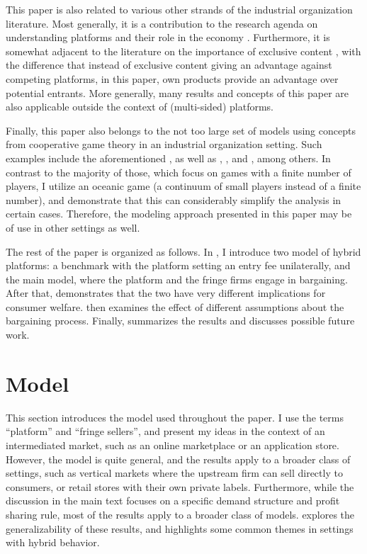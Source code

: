 \documentclass[a4paper]{article}
\begin{document}
This paper is also related to various other strands of the industrial organization literature.
Most generally, it is a contribution to the research agenda on understanding platforms and their role in the economy \parencite[e.g.][]{rochet2003platform,hagiu2004optimal,armstrong2006competition,evans2011platform,lee2014competing}.
Furthermore, it is somewhat adjacent to the literature on the importance of exclusive content \parencite[e.g.][]{hagiu2011exclusivity,lee2013vertical,dou2014sell,weeds2016tv}, with the difference that instead of exclusive content giving an advantage against competing platforms, in this paper, own products provide an advantage over potential entrants.
More generally, many results and concepts of this paper are also applicable outside the context of (multi-sided) platforms.

Finally, this paper also belongs to the not too large set of models using concepts from cooperative game theory in an industrial organization setting.
Such examples include the aforementioned \textcite{montez2007downstream}, as well as \textcite{hart1990property}, \textcite{levy1997individual}, \textcite{inderst2003bargaining} and \textcite{brugemann2019intra}, among others.
In contrast to the majority of those, which focus on games with a finite number of players, I utilize an oceanic game (a continuum of small players instead of a finite number), and demonstrate that this can considerably simplify the analysis in certain cases.
Therefore, the modeling approach presented in this paper may be of use in other settings as well.

The rest of the paper is organized as follows.
In , I introduce two model of hybrid platforms: a benchmark with the platform setting an entry fee unilaterally, and the main model, where the platform and the fringe firms engage in bargaining.
After that,  demonstrates that the two have very different implications for consumer welfare.
 then examines the effect of different assumptions about the bargaining process.
Finally,  summarizes the results and discusses possible future work.


\section{Model}
\label{sec:model}

This section introduces the model used throughout the paper.
I use the terms ``platform'' and ``fringe sellers'', and present my ideas in the context of an intermediated market, such as an online marketplace or an application store.
However, the model is quite general, and the results apply to a broader class of settings, such as vertical markets where the upstream firm can sell directly to consumers, or retail stores with their own private labels.
Furthermore, while the discussion in the main text focuses on a specific demand structure and profit sharing rule, most of the results apply to a broader class of models.
 explores the generalizability of these results, and highlights some common themes in settings with hybrid behavior.
\end{document}
